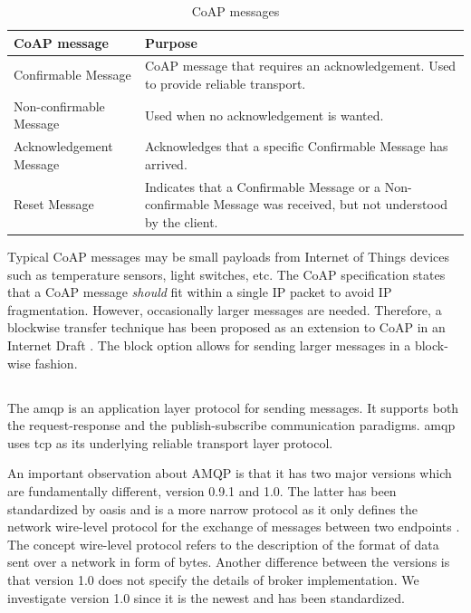 \begin{table}[h]
\centering
\begin{tabularx}{\textwidth}{|X|X|}
\hline
\textbf{CoAP message}   & \textbf{Purpose}                                                                                                  \\ \hline
Confirmable Message     & CoAP message that  requires an acknowledgement. Used to provide reliable transport.                               \\ \hline
Non-confirmable Message & Used when no acknowledgement is wanted.                                                                           \\ \hline
Acknowledgement Message & Acknowledges that a specific Confirmable Message has arrived.                                                     \\ \hline
Reset Message           & Indicates that a Confirmable Message or a Non-confirmable Message was received, but not understood by the client. \\ \hline
\end{tabularx}

\caption{CoAP messages}
\label{table:coap-messages}
\end{table}

Typical CoAP messages may be small payloads from Internet of Things devices such
as temperature sensors, light switches, etc. The CoAP specification states that
a CoAP message \textit{should} fit within a single IP packet to avoid IP
fragmentation. However, occasionally larger messages are needed. Therefore, a
blockwise transfer technique has been proposed as an extension to CoAP in an
Internet Draft \cite{draft-coap-blockwise}. The block option allows for sending
larger messages in a block-wise fashion.

\subsection{}

The \gls{amqp} is an application layer protocol for sending messages.
It supports both the request-response and the publish-subscribe communication
paradigms. \gls{amqp} uses \gls{tcp} as its underlying reliable transport layer
protocol.

An important observation about AMQP is that it has two major versions which are
fundamentally different, version 0.9.1 and 1.0. The latter has been standardized
by \gls{oasis} and is a  more narrow protocol as it only defines the network
wire-level protocol for the exchange of messages between two endpoints
\cite{oasis-amqp}. The concept wire-level protocol refers to the description of
the format of data sent over a network in form of bytes. Another difference
between the versions is that version 1.0 does not specify the details of broker
implementation. We investigate version 1.0 since it is the newest and has been
standardized.

